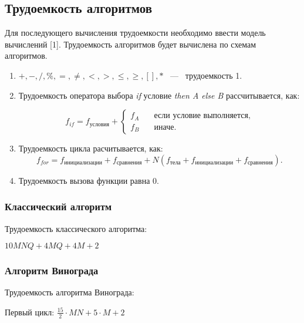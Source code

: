 \subsection{Трудоемкость алгоритмов}

Для последующего вычисления трудоемкости необходимо ввести модель вычислений [1].
Трудоемкость алгоритмов будет вычислена по схемам алгоритмов.

\begin{enumerate}
    \item $+, -, /, \%, =, \neq, <, >, \leq, \geq, [ ], *$ ~---~ трудоемкость 1.
    \item Трудоемкость оператора выбора \textit{if} условие \textit{then A else B} рассчитывается, как:

    \begin{equation}
        f_{if} = f_{\text{условия}} + \begin{cases}
                                f_A & \quad \text{если условие выполняется,} \\
                                f_B & \quad \text{иначе}.
                                \end{cases}
    \end{equation}

    \item Трудоемкость цикла расчитывается, как:
    \begin{equation}
        f_{for} = f_{\text{инициализации}} + f_{\text{сравнения}} + N(f_{\text{тела}} + f_{\text{инициализации}} + f_{\text{сравнения}}).
    \end{equation}

    \item Трудоемкость вызова функции равна 0.
\end{enumerate}

\subsubsection{Классический алгоритм}

Трудоемкость классического алгоритма:

$10MNQ + 4MQ + 4M + 2$

\subsubsection{Алгоритм Винограда}

Трудоемкость алгоритма Винограда:

Первый цикл: $\frac{15}{2} \cdot MN + 5 \cdot M + 2$

